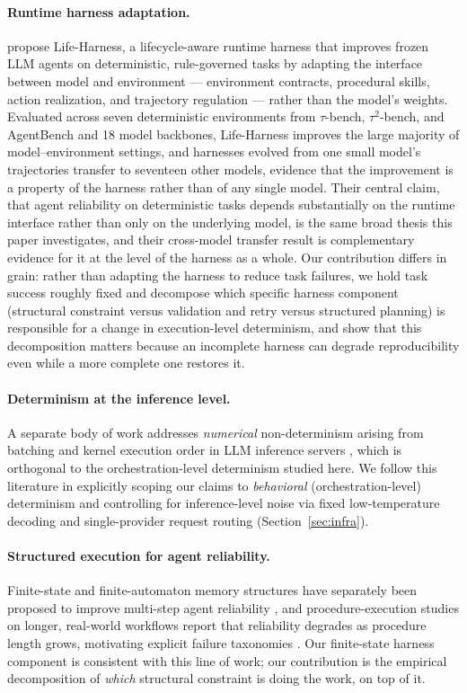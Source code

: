 \documentclass[11pt]{article}
\begin{document}
\paragraph{Runtime harness adaptation.} \cite{lifeharness2026} propose Life-Harness, a lifecycle-aware runtime harness that improves frozen LLM agents on deterministic, rule-governed tasks by adapting the interface between model and environment --- environment contracts, procedural skills, action realization, and trajectory regulation --- rather than the model's weights. Evaluated across seven deterministic environments from $\tau$-bench, $\tau^2$-bench, and AgentBench and 18 model backbones, Life-Harness improves the large majority of model--environment settings, and harnesses evolved from one small model's trajectories transfer to seventeen other models, evidence that the improvement is a property of the harness rather than of any single model. Their central claim, that agent reliability on deterministic tasks depends substantially on the runtime interface rather than only on the underlying model, is the same broad thesis this paper investigates, and their cross-model transfer result is complementary evidence for it at the level of the harness as a whole. Our contribution differs in grain: rather than adapting the harness to reduce task failures, we hold task success roughly fixed and decompose which specific harness component (structural constraint versus validation and retry versus structured planning) is responsible for a change in execution-level determinism, and show that this decomposition matters because an incomplete harness can degrade reproducibility even while a more complete one restores it.

\paragraph{Determinism at the inference level.} A separate body of work addresses \emph{numerical} non-determinism arising from batching and kernel execution order in LLM inference servers \cite{thinkingmachines2025}, which is orthogonal to the orchestration-level determinism studied here. We follow this literature in explicitly scoping our claims to \emph{behavioral} (orchestration-level) determinism and controlling for inference-level noise via fixed low-temperature decoding and single-provider request routing (Section~\ref{sec:infra}).

\paragraph{Structured execution for agent reliability.} Finite-state and finite-automaton memory structures have separately been proposed to improve multi-step agent reliability \cite{sciborg2025}, and procedure-execution studies on longer, real-world workflows report that reliability degrades as procedure length grows, motivating explicit failure taxonomies \cite{networkprocedures2026}. Our finite-state harness component is consistent with this line of work; our contribution is the empirical decomposition of \emph{which} structural constraint is doing the work, on top of it.
\end{document}

